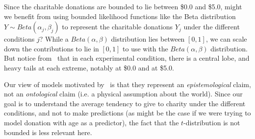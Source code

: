 Since the charitable donations are bounded to lie between \$0.0 and \$5.0, might we benefit from using bounded likelihood functions like the Beta distribution $Y \sim Beta(\alpha_j, \beta_j)$ to represent the charitable donations $Y_j$ under the different conditions $j$? While a $Beta(\alpha, \beta)$ distribution lies between $[0,1]$, we can scale down the contributions to lie in $[0,1]$ to use with the $Beta(\alpha, \beta)$ distribution. But notice from~ that in each experimental condition, there is a central lobe, and heavy tails at each extreme, notably at \$0.0 and at \$5.0. 

Our view of models motivated by~\textcite{McElreath2015} is that they represent an \textit{epistemological} claim, not an \textit{ontological} claim (i.e. a physical assumption about the world). Since our goal is to understand the average tendency to give to charity under the different conditions, and not to make predictions (as might be the case if we were trying to model donation with age as a predictor), the fact that the $t$-distribution is not bounded is less relevant here. 
